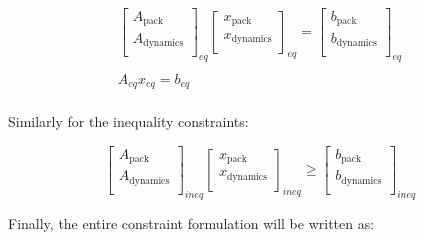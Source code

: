 \documentclass[conference]{IEEEtran}
\begin{document}
\[
\begin{array}{c}
    \begin{bmatrix}
        A_{\textrm{pack}}     \\
        A_{\textrm{dynamics}} \\
    \end{bmatrix}_{eq}
    \begin{bmatrix}
        x_{\textrm{pack}}     \\
        x_{\textrm{dynamics}} \\
    \end{bmatrix}_{eq} =
    \begin{bmatrix}
        b_{\textrm{pack}}     \\
        b_{\textrm{dynamics}} \\
    \end{bmatrix}_{eq} \\
    \\
    A_{eq} x_{eq} = b_{eq} \\
\end{array}
\]

Similarly for the inequality constraints:

\[
\begin{bmatrix}
    A_{\textrm{pack}}     \\
    A_{\textrm{dynamics}} \\
\end{bmatrix}_{ineq}
\begin{bmatrix}
    x_{\textrm{pack}}     \\
    x_{\textrm{dynamics}} \\
\end{bmatrix}_{ineq} \geq
\begin{bmatrix}
    b_{\textrm{pack}}     \\
    b_{\textrm{dynamics}} \\
\end{bmatrix}_{ineq}
\]

Finally, the entire constraint formulation will be written as:
\end{document}
